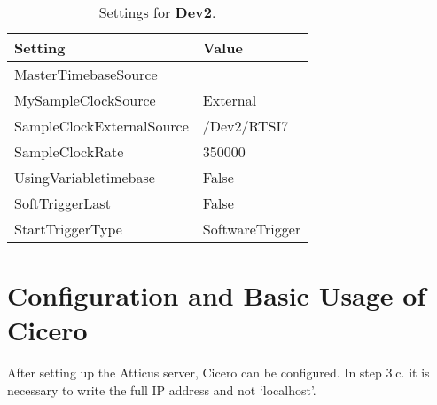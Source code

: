 \begin{table}[H]
	\centering
	\caption{Settings for \textbf{Dev2}.}
	\label{tab:settings dev2}
	\begin{tabular}{*{2}{|l}|}
		\hline
		\textbf{Setting} & Value \\ \hline
		MasterTimebaseSource & \\ \hline
		MySampleClockSource & External \\ \hline
		SampleClockExternalSource & /Dev2/RTSI7 \\ \hline
		SampleClockRate & 350000 \\ \hline
		UsingVariabletimebase & False \\ \hline
		SoftTriggerLast & False \\ \hline
		StartTriggerType & SoftwareTrigger \\ \hline
	\end{tabular}        	
\end{table}

\section{Configuration and Basic Usage of Cicero}\label{sec:Configuration and Basic Usage of Cicero}
After setting up the Atticus server, Cicero can be configured. In step 3.c. it is necessary to write the full IP address and not `localhost'.